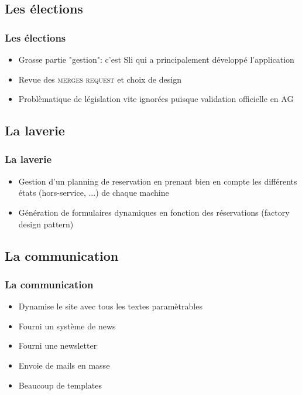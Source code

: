 \documentclass[10pt]{beamer}
\begin{document}
\subsection{Les élections}
\begin{frame}[fragile]\frametitle{Les élections}
    \begin{itemize}
        \item Grosse partie "gestion": c'est Sli qui a principalement développé l'application
        \item Revue des \textsc{merges request} et choix de design
        \item Problèmatique de législation vite ignorées puisque validation officielle en AG
    \end{itemize}
\end{frame}

\subsection{La laverie}
\begin{frame}[fragile]\frametitle{La laverie}
    \begin{itemize}
        \item Gestion d'un planning de reservation en prenant bien en compte les différents états (hors-service, ...) de
            chaque machine
        \item Génération de formulaires dynamiques en fonction des réservations (factory design pattern)
    \end{itemize}
\end{frame}

\subsection{La communication}
\begin{frame}[fragile]\frametitle{La communication}
    \begin{itemize}
        \item Dynamise le site avec tous les textes paramètrables
        \item Fourni un système de news
        \item Fourni une newsletter
    \end{itemize}
    \begin{itemize}
        \item Envoie de mails en masse
        \item Beaucoup de templates
    \end{itemize}
\end{frame}
\end{document}
